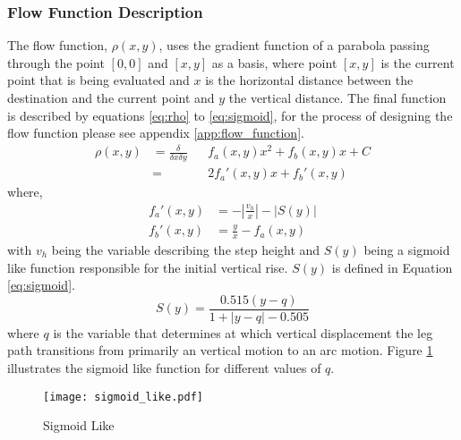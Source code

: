             \subsubsection{Flow Function Description} \label{sec:flow_function}
                The flow function, \(\rho(x,y)\), uses the gradient function of a parabola passing through the point \([0,0]\) and \([x,y]\) as a basis, where point \([x,y]\)
                is the current point that is being evaluated and \(x\) is the horizontal distance between the destination and the current point and \(y\) the
                vertical distance. The final function is described by equations \ref{eq:rho} to \ref{eq:sigmoid}, for the process of designing the flow function
                please see appendix \ref{app:flow_function}.
                \begin{equation} \label{eq:rho}
                    \begin{aligned}
                        \rho(x,y) &= \frac{\delta}{\delta x\delta y}&&f_a(x,y)x^2 + f_b(x,y)x + C\\
                        &= &&2f_a'(x,y)x + f_b'(x,y)    
                    \end{aligned}
                \end{equation}
                where, %
                \begin{align} \label{eq:fa}
                    f_a'(x,y) &= -\left|\frac{v_h}{x}\right| - \left|S(y)\right|\\
                    f_b'(x,y) &= \frac{y}{x} - f_a(x,y)
                \end{align}
                with \(v_h\) being the variable describing the step height and \(S(y)\) being a sigmoid like function 
                responsible for the initial vertical rise. \(S(y)\) is defined in Equation \ref{eq:sigmoid}.
                \begin{equation} \label{eq:sigmoid}
                    S(y) = \frac{0.515(y-q)}{1+\left|y-q\right|-0.505}
                \end{equation}
                where \(q\) is the variable that determines at which vertical displacement the leg path transitions from primarily an vertical motion to
                an arc motion. Figure \ref{fig:sigmoid_like} illustrates the sigmoid like function for different values of \(q\).
                \begin{figure}[h]
                    \centering
                    \hspace{-1.38cm}
                    \texttt{[image: sigmoid\_like.pdf]}
                    \caption{Sigmoid Like}
                    \label{fig:sigmoid_like}
                \end{figure}

